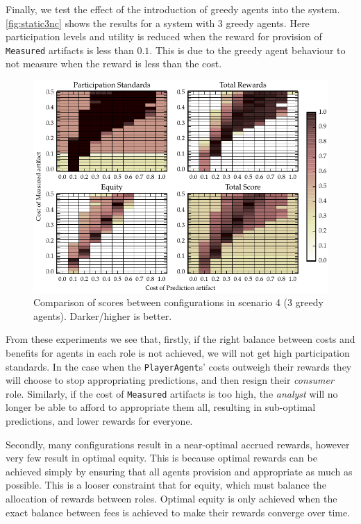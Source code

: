Finally, we test the effect of the introduction of greedy agents into
the system. \autoref{fig:static3nc} shows the results for a system with 3 greedy agents. Here participation levels and utility is reduced when the
reward for provision of \texttt{Measured} artifacts is less than $0.1$. This is
due to the greedy agent behaviour to not measure when the reward is
less than the cost.

\begin{figure}
\includegraphics{gfx/kc/static_1_3nc.pdf} 
\caption[Comparison of scores between configurations in scenario 4 (3 greedy agents).]{Comparison of scores between configurations in scenario 4 (3 greedy agents). Darker/higher is better.}\label{fig:static3nc}
\end{figure}

From these experiments we see that, firstly, if the right balance between
costs and benefits for agents in each role is not achieved, we will not get
high participation standards. In the case when the \texttt{PlayerAgent}s' costs
outweigh their rewards they will choose to stop appropriating predictions, and
then resign their \emph{consumer} role. Similarly, if the cost of
\texttt{Measured} artifacts is too high, the \emph{analyst} will no longer be
able to afford to appropriate them all, resulting in sub-optimal
predictions, and lower rewards for everyone.

Secondly, many configurations result in a near-optimal accrued rewards, however very
few result in optimal equity. This is because optimal rewards can be achieved
simply by ensuring that all agents provision and appropriate as much as
possible. This is a looser constraint that for equity, which must balance the
allocation of rewards between roles. Optimal equity is only achieved when
the exact balance between fees is achieved to make their rewards converge
over time.

